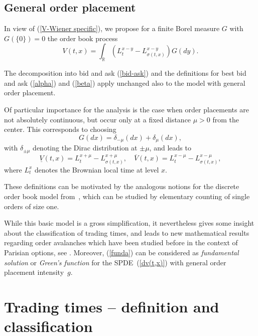 \documentclass[11pt]{scrartcl}
\begin{document}
\subsection{General order placement}

In view of (\ref{V-Wiener specific}), we propose for a finite Borel measure $%
G$ with $G(\{0\})=0$ the order book process 
\begin{equation}
V(t,x)=\int_{\mathbb{R}}\left( L_{t}^{x-y}-L_{\sigma (t,x)}^{x-y}\right)
G(dy).  \label{V-Wiener}
\end{equation}

The decomposition into bid and ask (\ref{bid-ask}) and the definitions for
best bid and ask (\ref{alpha}) and (\ref{beta}) apply unchanged also to the
model with general order placement.

Of particular importance for the analysis is the case when order placements
are not absolutely continuous, but occur only at a fixed distance $\mu >0$
from the center. This corresponds to choosing 
\begin{equation}
G(dx)=\delta _{-\mu }(dx)+\delta _{\mu }(dx),
\end{equation}%
with $\delta _{\pm \mu }$ denoting the Dirac distribution at $\pm \mu $, and
leads to 
\begin{equation}
\underline{V}(t,x)=L_{t}^{x+\mu }-L_{\sigma (t,x)}^{x+\mu },\quad \overline{V%
}(t,x)=L_{t}^{x-\mu }-L_{\sigma (t,x)}^{x-\mu },  \label{funda}
\end{equation}%
where $L_{t}^{x}$ denotes the Brownian local time at level $x$.

These definitions can be motivated by the analogous notions for the discrete
order book model from~\cite{HKR-DISCRETE}, which can be studied by
elementary counting of single orders of size one.

While this basic model is a gross simplification, it nevertheless gives some
insight about the classification of trading times, and leads to new
mathematical results regarding order avalanches which have been studied
before in the context of Parisian options, see \cite{DW}. 
Moreover, (\ref{funda}) can be considered as \emph{fundamental solution} 
or \emph{Green's function} for the SPDE~(\ref{dv(t,x)}) with general order placement
intensity~$g$.

\section{Trading times -- definition and classification}
\end{document}
